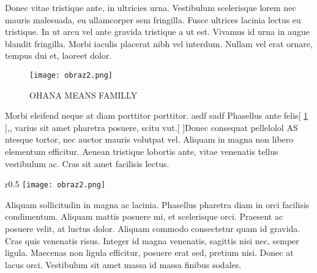 \documentclass[a4paper,12pt]{amsart}
\begin{document}
Donec vitae tristique ante, in ultricies urna. Vestibulum scelerisque lorem nec mauris malesuada, eu ullamcorper sem fringilla. Fusce ultrices lacinia lectus eu tristique. In ut arcu vel ante gravida tristique a ut est. Vivamus id urna in augue blandit fringilla. Morbi iaculis placerat nibh vel interdum. Nullam vel erat ornare, tempus dui et, laoreet dolor.
\begin{figure}[h]
    \centering
    \texttt{[image: obraz2.png]}
    \caption{OHANA MEANS FAMILLY}
    \label{fig:mesh1}
\end{figure}
Morbi eleifend neque at diam porttitor porttitor. asdf sadf Phasellus ante felis[ \ref{fig:mesh1} ],, varius sit amet pharetra posuere, scitu vut.[ \pageref{fig:mesh1} ]Donec consequat pellelolol AS ntesque tortor, nec auctor mauris volutpat vel. Aliquam in magna non libero elementum efficitur. Aenean tristique lobortis ante, vitae venenatis tellus vestibulum ac. Cras sit amet facilisis lectus. 
\begin{wrapfigure}{r}{0.5 \textwidth}
    \texttt{[image: obraz2.png]}
    \caption{OHANA MEANS FAMILLY}
    \label{fig:mesh1}
\end{wrapfigure}
Aliquam sollicitudin in magna ac lacinia. Phasellus pharetra diam in orci facilisis condimentum. Aliquam mattis posuere mi, et scelerisque orci. Praesent ac posuere velit, at luctus dolor. Aliquam commodo consectetur quam id gravida. Cras quis venenatis risus. Integer id magna venenatis, sagittis nisi nec, semper ligula. Maecenas non ligula efficitur, posuere erat sed, pretium nisi. Donec at lacus orci. Vestibulum sit amet massa id massa finibus sodales.
\begin{figure}[h]
\end{figure}
\end{document}
